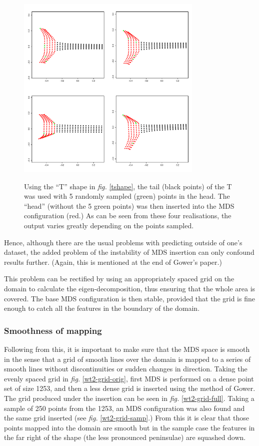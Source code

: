 \documentclass[a4paper,10pt]{article}
\newcommand{\fig}[1]{\emph{fig.} \ref{#1}}
\begin{document}
\begin{figure}
\centering
\includegraphics[width=3.5in]{figs/tshaperand.pdf} \\
\caption{Using the ``T'' shape in \fig{tshape}, the tail (black points) of the T was used with 5 randomly sampled (green) points in the head. The ``head'' (without the 5 green points) was then inserted into the MDS configuration (red.) As can be seen from these four realisations, the output varies greatly depending on the points sampled.}
\label{tshaperand}
\end{figure}

Hence, although there are the usual problems with predicting outside of one's dataset, the added problem of the instability of MDS insertion can only confound results further. (Again, this is mentioned at the end of Gower's paper.)

This problem can be rectified by using an appropriately spaced grid on the domain to calculate the eigen-decomposition, thus ensuring that the whole area is covered. The base MDS configuration is then stable, provided that the grid is fine enough to catch all the features in the boundary of the domain.

\subsubsection{Smoothness of mapping}

Following from this, it is important to make sure that the MDS space is smooth in the sense that a grid of smooth lines over the domain is mapped to a series of smooth lines without discontinuities or sudden changes in direction. Taking the evenly spaced grid in \fig{wt2-grid-orig}, first MDS is performed on a dense point set of size 1253, and then a less dense grid is inserted using the method of Gower. The grid produced under the insertion can be seen in \fig{wt2-grid-full}. Taking a sample of 250 points from the 1253, an MDS configuration was also found and the same grid inserted (see \fig{wt2-grid-samp}.) From this it is clear that those points mapped into the domain are smooth but in the sample case the features in the far right of the shape (the less pronounced peninsulae) are squashed down.
\end{document}
